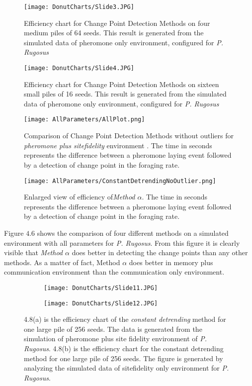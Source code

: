 \begin{figure}[h]
	\texttt{[image: DonutCharts/Slide3.JPG]}
	\caption{Efficiency chart for Change Point Detection Methods on four medium  piles of 64 seeds. This result is generated from the simulated data of pheromone only environment, configured for \textit{P. Rugosus}}
\end{figure}
\begin{figure}[H]
	\texttt{[image: DonutCharts/Slide4.JPG]}
	\caption{Efficiency chart for Change Point Detection Methods on sixteen small piles of 16 seeds. This result is generated from the simulated data of pheromone only environment, configured for \textit{P. Rugosus}}
\end{figure}
\begin{figure}[h]
	\texttt{[image: AllParameters/AllPlot.png]}
	\caption{Comparison of Change Point Detection Methods without outliers for \textit{pheromone plus sitefidelity} environment . The time in seconds represents the difference between a pheromone laying event followed by a detection of change point in the foraging rate.}
\end{figure}
\begin{figure}
	\texttt{[image: AllParameters/ConstantDetrendingNoOutlier.png]}
	\caption{Enlarged view of efficiency of\textit{Method $\alpha$}. The time in seconds represents the difference between a pheromone laying event followed by a detection of change point in the foraging rate.}
\end{figure}
Figure $4.6$ shows the comparison of four different methods on a simulated environment with all parameters for \textit{P. Rugosus}. From this figure it is clearly visible that \textit{Method $\alpha$} does better in detecting the change points than any other methods. As a matter of fact, Method $\alpha$ does better in memory plus communication environment than the communication only environment.\par 
\begin{figure}[h]
	\begin{subfigure}{0.5\textwidth}
		\centering
		\texttt{[image: DonutCharts/Slide11.JPG]}
		\caption{}
		\label{fig:AllParam-Onepile}
	\end{subfigure}%
	\begin{subfigure}{0.5\textwidth}
		\centering
		\texttt{[image: DonutCharts/Slide12.JPG]}
		\caption{}
		\label{fig:siteFidelity-OnePile}
	\end{subfigure}
	\caption{4.8(a) is the efficiency chart of the \textit{constant detrending} method for one large pile of 256 seeds. The data is generated from the simulation of pheromone plus site fidelity environment of \textit{P. Rugosus}. 
		4.8(b) is the efficiency chart for the constant detrending method for one large pile of 256 seeds. The figure is generated by analyzing the simulated data of sitefidelity only environment for \textit{P. Rugosus}. }
	\label{fig:fig}
\end{figure}
